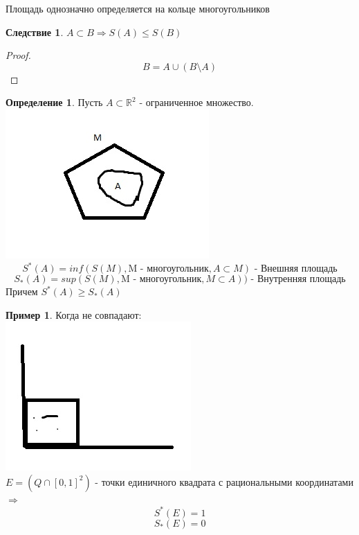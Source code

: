 \documentclass[a4paper]{article}
\theoremstyle{definition}
\newtheorem*{definition*}{Определение}
\newtheorem*{exmp}{Пример}
\newtheorem*{comment}{Замечание}
\newtheorem{consequence}{Следствие}
\numberwithin{theorem}{subsection}
\numberwithin{lemma}{subsection}
\numberwithin{definition}{subsection}
\numberwithin{comment*}{subsection}
\numberwithin{consequence}{subsection}
\numberwithin{property}{subsection}
\begin{document}

\comment Площадь однозначно определяется на кольце многоугольников
\begin{consequence}
 $A \subset B \Rightarrow S(A) \leq S(B) $
\end{consequence}
\begin{proof}
 $$ B = A \cup (B \setminus A) $$
\end{proof}
\begin{definition*}
 Пусть $A\subset \mathbb{R}^2$ - ограниченное множество. \\
 \includegraphics{ploshad}
 $$ S^*(A) = inf(S(M), \text{M - многоугольник}, A\subset M ) \text{ - Внешняя площадь}$$
 $$ S_*(A) = sup(S(M), \text{M - многоугольник}, M \subset A )) \text{ - Внутренняя площадь}$$
 Причем $S^*(A) \geq S_*(A)$
\end{definition*}
\begin{exmp}
 Когда не совпадают:\\
 \includegraphics{edinsquare}\\
 $ E = (Q \cap [0,1]^2)$ - точки единичного квадрата с рациональными координатами $\Rightarrow$
 $$  S^*(E) = 1 $$
 $$  S_*(E) = 0 $$
\end{exmp}
\end{document}
